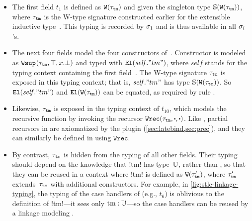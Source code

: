 \begin{itemize}
  [labelsep=*,leftmargin=1pc,itemsep=3pt]

\item 
The first field $t_1$ is defined as $\texttt{W}({\tau_{\texttt{tm}}})$
and given the singleton type $\mathbb{S}({\texttt{W}({\tau_{\texttt{tm}}})})$, where $\tau_{\texttt{tm}}$
is the W-type signature constructed earlier for the extensible inductive type~.
This typing is recorded by $\sigma_1$ and is thus available in all $\sigma_i$'s.

\item 
The next four fields model the four constructors of~.
Constructor  is modeled as $\texttt{Wsup}_{}({\tau_{\texttt{tm}}},{\top},{x.\bot})$
and typed with $\texttt{El}({\mathit{self}."tm"})$, where $\mathit{self}$ stands for
the typing context containing the first field~.
The W-type signature $\tau_{\texttt{tm}}$ is exposed in
this typing context; that is, $\mathit{self}."tm"$ has type $\mathbb{S}({\texttt{W}({\tau_{\texttt{tm}}})})$.
So $\texttt{El}({\mathit{self}."tm"})$ and $\texttt{El}({\texttt{W}({\tau_{\texttt{tm}}})})$ can be equated,
as required by rule .

\item
Likewise, $\tau_{\texttt{tm}}$ is exposed in the typing context of
$t_{10}$, which models the recursive function  by invoking
the recursor $\Wrec{\wsig_{\texttt{tm}}}{\cDot}{\cDot}$.
%
Like , partial recursors in \Lang are axiomatized by the plugin
(\cref{sec:latebind,sec:prec}), and they can similarly be defined in \TT
using $\texttt{Wrec}$.

\item
By contrast, $\tau_{\texttt{tm}}$ is hidden from the typing of all other fields.
Their typing should depend on the knowledge that \lsti!tm! has type~$\mathbb{U}$,
rather than ,
so that they can be reused in a context where
\lsti!tm! is defined as $\texttt{W}({\tau'_{\texttt{tm}}})$,
where $\tau'_{\texttt{tm}}$ extends~$\tau_{\texttt{tm}}$ with additional constructors.
%
For example, in \cref{fig:stlc-linkage-typing}, the typing of the case handlers of
 (e.g., $t_6$) is oblivious to the definition of \lsti!tm!---it sees only $\text{\lsti!tm!}:\cU$---so
the case handlers can be reused by a linkage modeling .

\end{itemize}

